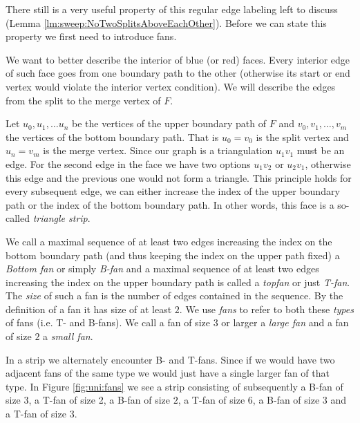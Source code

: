       There still is a very useful property of this regular edge labeling left to discuss (Lemma \ref{lm:sweep:NoTwoSplitsAboveEachOther}). Before we can state this property we first need to introduce fans.


      We want to better describe the interior of blue (or red) faces. Every interior edge of such face goes from one boundary path to the other (otherwise its start or end vertex would violate the interior vertex condition). We will describe the edges from the split to the merge vertex of $F$.

      Let $u_0 , u_1, \ldots u_n$ be the vertices of the upper boundary path of $F$ and $v_0, v_1, \ldots, v_m$ the vertices of the bottom boundary path. That is $u_0=v_0$ is the split vertex and $u_n = v_m$ is the merge vertex. Since our graph is a triangulation $u_1v_1$ must be an edge. For the second edge in the face we have two options $u_1v_2$ or $u_2v_1$, otherwise this edge and the previous one would not form a triangle. This principle holds for every subsequent edge, we can either increase the index of the upper boundary path or the index of the bottom boundary path. In other words, this face is a so-called \emph{triangle strip}.

      We call a maximal sequence of at least two edges increasing the index on the bottom boundary path (and thus keeping the index on the upper path fixed) a \emph{Bottom fan} or simply \emph{B-fan} and a maximal sequence of at least two edges increasing the index on the upper boundary path is called a \emph{topfan} or just \emph{T-fan}.
      The \emph{size} of such a fan is the number of edges contained in the sequence. By the definition of a fan it has size of at least $2$.
      We use \emph{fans} to refer to both these \emph{types} of fans (i.e. T- and B-fans).
      We call a fan of size $3$ or larger a \emph{large fan} and a fan of size $2$ a \emph{small fan}.

      In a strip we alternately encounter B- and T-fans. Since if we would have two adjacent fans of the same type we would just have a single larger fan of that type.
      In Figure \ref{fig:uni:fans} we see a strip consisting of subsequently a B-fan of size $3$, a T-fan of size 2, a B-fan of size $2$, a T-fan of size $6$, a B-fan of size $3$ and a T-fan of size $3$.

